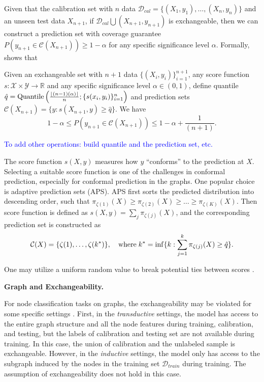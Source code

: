 Given that the calibration set with $n$ data $\mathcal{D}_{cal}=\{ (X_1, y_1), \dots, (X_n, y_n) \}$ and an unseen test data $X_{n+1}$, if $\mathcal{D}_{cal} \bigcup {(X_{n+1}, y_{n+1})}$ is exchangeable, then we can construct a prediction set with coverage guarantee $P(y_{n+1}\in \mathcal{C}(X_{n+1})) \geq 1 - \alpha$ for any specific significance level $\alpha$.
Formally, \cite{vovk2005algorithmic} shows that
\begin{theorem}
    Given an exchangeable set with $n+1$ data $\{ (X_i, y_i)\}_{i=1}^{n+1}$, 
    any score function $s: \mathcal{X}\times \mathcal{Y}\to \mathbb{R}$ and any specific significance level $\alpha \in (0, 1)$,
    define quantile $\hat{q}=\textnormal{Quantile}\left( \frac{ \lfloor (n-1)(\alpha) \rfloor }{n}; \{ s(x_i, y_i) \}_{i=1}^n \right)$ and prediction sets 
    $\mathcal{C}(X_{n+1}) = \{ y: s(X_{n+1},y) \geq \hat{q} \}$.
    We have
    \begin{equation}
        1-\alpha \leq P \left( y_{n+1} \in \mathcal{C}(X_{n+1}) \right) \leq 1- \alpha + \frac{1}{(n+1)}.
    \end{equation}
\end{theorem}
\textcolor{blue}{To add other operations: build quantile and the prediction set, etc.}

The score function $s(X, y)$ measures how $y$ ``conforms'' to the prediction at $X$.
Selecting a suitable score function is one of the challenges in conformal prediction, especially for conformal prediction in the graphs. 
% 
One popular choice is adaptive prediction sets (APS).
APS first sorts the predicted distribution into descending order, such that 
$\pi_{\zeta(1)}(X) \geq \pi_{\zeta(2)}(X) \geq \dots \geq \pi_{\zeta(K)}(X)$.
Then score function is defined as $s(X,y) = \sum_{j} \pi_{\zeta(j)}(X)$,
and the corresponding prediction set is constructed as
\begin{equation}
    \mathcal{C}(X)=\{ \zeta(1), \dots, \zeta(k^\ast) \}, \quad
    \textnormal{where} \; k^\ast=\inf\{ k: \sum_{j=1}^k \pi_{\zeta(j)}(X) \geq \hat{q} \}.
\end{equation}

% 
One may utilize a uniform random value to break potential ties between scores \cite{stutz2021learning}.


\noindent\textbf{Graph and Exchangeability.} 

For node classification tasks on graphs, 
the exchangeability may be violated for some specific settings \cite{zargarbashi2023conformal}.
First, 
in the \textit{transductive} settings, 
the model has access to the entire graph structure and all the node features during training, calibration, and testing, 
but the labels of calibration and testing set are not available during training. 
In this case, the union of calibration and the unlabeled sample is exchangeable.
However, 
in the \textit{inductive} settings, 
the model only has access to the subgraph induced by the nodes in the training set $\mathcal{D}_{train}$ during training.
The assumption of exchangeability does not hold in this case.


